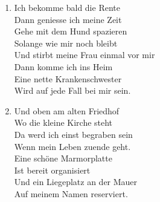 \begin{guitarMagic}
\begin{enumerate}
        \item Ich bekomme bald die Rente\\
            Dann geniesse ich meine Zeit\\
            Gehe mit dem Hund spazieren\\
            Solange wie mir noch bleibt\\
            Und stirbt meine Frau einmal vor mir\\
            Dann komme ich ins Heim\\
            Eine nette Krankenschwester\\
            Wird auf jede Fall bei mir sein.\\

            \liedweiter
        \item Und oben am alten Friedhof\\
            Wo die kleine Kirche steht\\
            Da werd ich einst begraben sein\\
            Wenn mein Leben zuende geht.\\
            Eine schöne Marmorplatte\\
            Ist bereit organisiert\\
            Und ein Liegeplatz an der Mauer\\
            Auf meinem Namen reserviert.\\
    \end{enumerate}
\end{guitarMagic}
